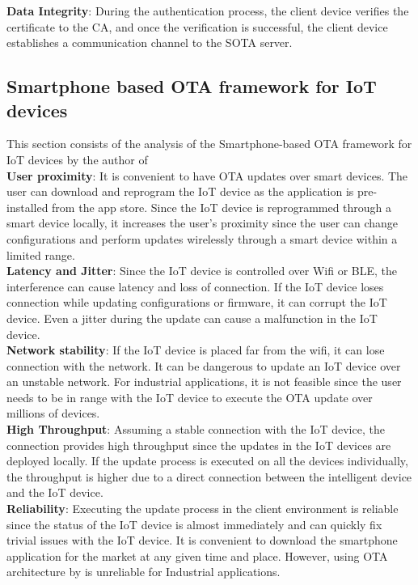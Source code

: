 \documentclass[12pt,a4paper]{article}
\begin{document}
{\textbf{Data Integrity}: During the authentication process, the client device verifies the certificate to the CA, and once the verification is successful, the client device establishes a communication channel to the SOTA server. \cite{r28} \\

\subsection{Smartphone based OTA framework for IoT devices}

This section consists of the analysis of the Smartphone-based OTA framework for IoT devices by the author of \cite{r29} \\

\textbf{User proximity}: It is convenient to have OTA updates over smart devices. The user can download and reprogram the IoT device as the application is pre-installed from the app store. Since the IoT device is reprogrammed through a smart device locally, it increases the user's proximity since the user can change configurations and perform updates wirelessly through a smart device within a limited range. \cite{r29} \\

\textbf{Latency and Jitter}: Since the IoT device is controlled over Wifi or BLE, the interference can cause latency and loss of connection. If the IoT device loses connection while updating configurations or firmware, it can corrupt the IoT device. Even a jitter during the update can cause a malfunction in the IoT device. \\

\textbf{Network stability}: If the IoT device is placed far from the wifi, it can lose connection with the network. It can be dangerous to update an IoT device over an unstable network. For industrial applications, it is not feasible since the user needs to be in range with the IoT device to execute the OTA update over millions of devices. \\

\textbf{High Throughput}: Assuming a stable connection with the IoT device, the connection provides high throughput since the updates in the IoT devices are deployed locally. If the update process is executed on all the devices individually, the throughput is higher due to a direct connection between the intelligent device and the IoT device. \\

\textbf{Reliability}: Executing the update process in the client environment is reliable since the status of the IoT device is almost immediately and can quickly fix trivial issues with the IoT device. It is convenient to download the smartphone application for the market at any given time and place. However, using OTA architecture by \cite{r29} is unreliable for Industrial applications. \\

}
\end{document}
